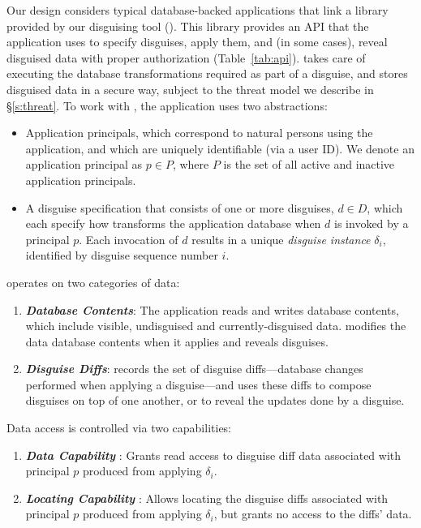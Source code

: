 Our design considers typical database-backed applications that link a library provided by our disguising
tool (\sys).
%
This library provides an API that the application uses to specify disguises, apply them, and (in some
cases), reveal disguised data with proper authorization (Table~\ref{tab:api}).
%
\sys takes care of executing the database transformations required as part of a disguise, and stores
disguised data in a secure way, subject to the threat model we describe in \S\ref{s:threat}.
%
To work with \sys, the application uses two abstractions:
\begin{itemize}
    \item Application principals, which correspond to natural persons using the application, and
	which are uniquely identifiable (\eg via a user ID).
	We denote an application principal as $p \in P$, where $P$ is the set of all active and
	inactive application principals.
    \item A disguise specification that consists of one or more disguises, $d \in D$, which each specify
	how \sys transforms the application database when $d$ is invoked by a principal $p$.
	Each invocation of $d$ results in a unique \emph{disguise instance} $\delta_i$, identified by
        disguise sequence number $i$.
\end{itemize}
%
\sys operates on two categories of data:
\begin{enumerate}
    \item \emph{\textbf{Database Contents}}: The application reads and writes database
        contents, which include visible, undisguised and currently-disguised data.
        \sys modifies the data database contents when it applies and reveals disguises.
    \item \emph{\textbf{Disguise Diffs}}: \sys records the set of disguise diffs---database changes performed when
        applying a disguise---and uses these diffs to compose disguises on top of one another, or to
        reveal the updates done by a disguise. 
\end{enumerate}

\noindent Data access is controlled via two capabilities: 
\begin{enumerate}
    \item \emph{\textbf{Data Capability }}: Grants read access to disguise diff data
        associated with principal $p$ produced from applying $\delta_i$.
    \item \emph{\textbf{Locating Capability }}: Allows locating the disguise
        diffs associated with principal $p$ produced from applying $\delta_i$, but grants no 
        access to the diffs' data.
\end{enumerate}

